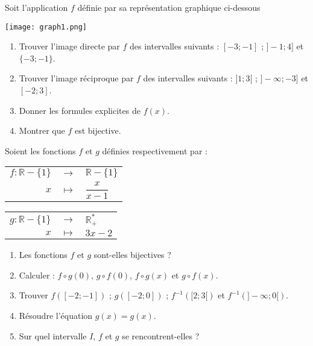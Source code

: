 \documentclass{article}
\begin{document}

\bigskip

Soit l’application \( f \) définie par sa représentation graphique ci-dessous

\bigskip

\begin{center}
    \texttt{[image: graph1.png]} %
\end{center}

\bigskip

\begin{enumerate}
    \item Trouver l’image directe par \( f \) des intervalles suivants : \([ -3; -1 ]\) ; \( ] -1; 4] \) et \(\{ -3; -1 \}\).
    \item Trouver l’image réciproque par \( f \) des intervalles suivants : \( ]1;3[ \) ; \( ] -\infty; -3] \) et \([ -2; 3 ]\).
    \item Donner les formules explicites de \( f(x) \).
    \item Montrer que \( f \) est bijective.
\end{enumerate}


\bigskip

Soient les fonctions \( f \) et \( g \) définies respectivement par :

\renewcommand{\arraystretch}{1.3} %
\begin{tabular}{rcl}
    $f : \mathbb{R} - \{1\}$ & $\to$ & $\mathbb{R} - \{1\}$ \\
    $x$ & $\mapsto$ & $\dfrac{x}{x - 1}$
\end{tabular}

\bigskip

\begin{tabular}{rcl}
    $g : \mathbb{R} - \{1\}$ & $\to$ & $\mathbb{R}^{*}_{+}$ \\
    $x$ & $\mapsto$ & $3x - 2$
\end{tabular}

\bigskip

\begin{enumerate}
    \item Les fonctions \( f \) et \( g \) sont-elles bijectives ?
    \item Calculer : \( f \circ g(0) \), \( g \circ f(0) \), \( f \circ g(x) \) et \( g \circ f(x) \).
    \item Trouver \( f([-2; -1]) \) ; \( g([-2;0]) \) ; \( f^{-1}([2;3[) \) et \( f^{-1}(] - \infty; 0[) \).
    \item Résoudre l’équation \( g(x) = g(x) \).
    \item Sur quel intervalle \( I \), \( f \) et \( g \) se rencontrent-elles ?
\end{enumerate}
\end{document}
